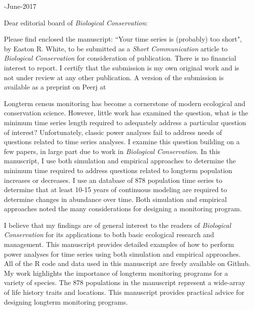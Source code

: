 \documentclass[]{article}
\begin{document}
-June-2017



\medskip
\medskip
\medskip
\noindent Dear editorial board of \emph{Biological Conservation}:

\medskip
\medskip



\indent \indent Please find enclosed the manuscript: ``Your time series is (probably) too short", by Easton R. White, to be submitted as a \emph{Short Communication} article to \emph{Biological Conservation} for consideration of publication. There is no financial interest to report. I certify that the submission is my own original work and is not under review at any other publication. A version of the submission is available as a preprint on Peerj at

Longterm census monitoring has become a cornerstone of modern ecological and conservation science. However, little work has examined the question, what is the minimum time series length required to adequately address a particular question of interest? Unfortunately, classic power analyses fail to address needs of questions related to time series analyses. I examine this question building on a few papers, in large part due to work in \emph{Biological Conservation}. In this manuscript, I use both simulation and empirical approaches to determine the minimum time required to address questions related to longterm population increases or decreases. I use an database of 878 population time series to determine that at least 10-15 years of continuous modeling are required to determine changes in abundance over time. Both simulation and empirical approaches noted the many considerations for designing a monitoring program.

I believe that my findings are of general interest to the readers of \emph{Biological Conservation} for its applications to both basic ecological research and management. This manuscript provides detailed examples of how to perform power analyses for time series using both simulation and empirical approaches. All of the R code and data used in this manuscript are freely available on Github. My work highlights the importance of longterm monitoring programs for a variety of species. The 878 populations in the manuscript represent a wide-array of life history traits and locations. This manuscript provides practical advice for designing longterm monitoring programs. 
\medskip
\end{document}
